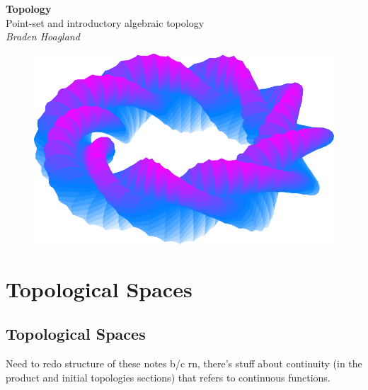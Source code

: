 \documentclass[10pt]{report}
\begin{document}
\begin{titlepage}
	\begin{center}
		{\Huge\textbf{Topology}}\\
		\vspace{4mm}
		Point-set and introductory algebraic topology\\
		\vspace{6mm}
		\textit{Braden Hoagland}
	\end{center}
	\begin{figure}[H]
		\centering
		\includegraphics[scale=0.9]{fig/curvy-donut.pdf}
	\end{figure}
	
\end{titlepage}

\tableofcontents



\chapter{Topological Spaces}


\section{Topological Spaces}

{\color{red}Need to redo structure of these notes b/c rn, there's stuff about continuity (in the product and initial topologies sections) that refers to continuous functions.}
\end{document}
